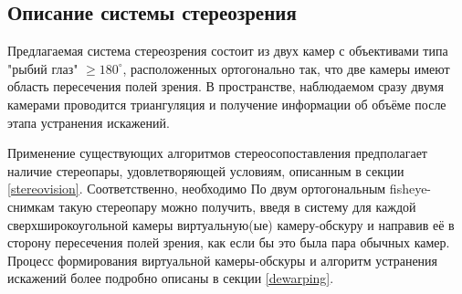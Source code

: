 \subsection{Описание системы стереозрения}

Предлагаемая система стереозрения состоит из двух камер с объективами типа "рыбий глаз" $\geqslant180^\circ$,
расположенных ортогонально так, что  две камеры имеют область пересечения полей зрения. В пространстве, наблюдаемом 
сразу  двумя камерами проводится триангуляция и получение информации об объёме после этапа устранения искажений.  %

 


Применение существующих алгоритмов стереосопоставления предполагает наличие стереопары, удовлетворяющей условиям, описанным в секции \ref{stereovision}.
Соответственно, необходимо 
По двум ортогональным fisheye-снимкам такую стереопару можно получить, введя в систему  для каждой сверхширокоугольной камеры виртуальную(ые) камеру-обскуру и направив 
её в сторону пересечения полей зрения, как если бы это была пара обычных камер. Процесс формирования виртуальной камеры-обскуры и 
алгоритм устранения искажений более подробно описаны в секции \ref{dewarping}.


